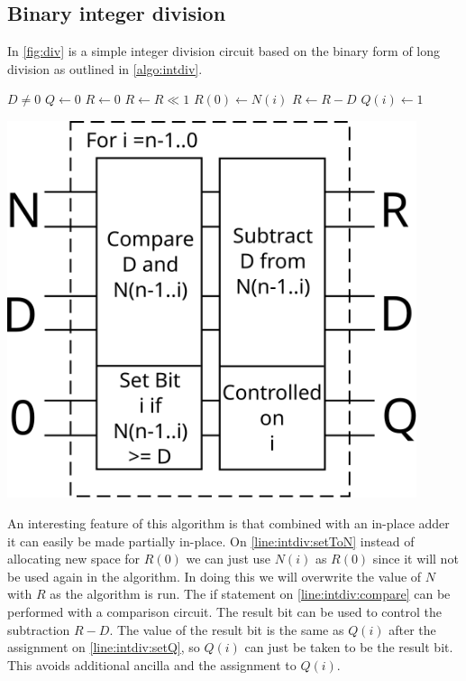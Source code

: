   \subsection{Binary integer division}
    In \cref{fig:div} is a simple integer division circuit based on the binary
    form of long division as outlined in \cref{algo:intdiv}.

    \noindent\begin{minipage}{.5\textwidth}
          \label{algo:intdiv}
         \begin{algorithmic}[1]
           \Require $D \neq 0$
           \State $Q \gets 0$
           \State $R \gets 0$
             \State $R \gets R \ll 1$
             \State $R(0) \gets N(i)$ \label{line:intdiv:setToN}
              \label{line:intdiv:compare}
               \State $R\gets R - D$
               \State $Q(i) \gets 1$ \label{line:intdiv:setQ}
             \EndIf
           \EndFor
         \end{algorithmic}
    \end{minipage}%
    \begin{minipage}{.5\textwidth}
        \centering
        \includegraphics[width=0.9\textwidth]{images/division}
         \label{fig:div}
    \end{minipage}
    \medskip

    An interesting feature of this algorithm is that combined with an in-place
    adder\cite{CDKM:2004} it can easily be made partially in-place.  On
    \cref{line:intdiv:setToN} instead of allocating new space for $R(0)$ we can
    just use $N(i)$ as $R(0)$ since it will not be used again in the algorithm.
    In doing this we will overwrite the value of $N$ with $R$ as the algorithm
    is run.  The if statement on \cref{line:intdiv:compare} can be performed
    with a comparison circuit.  The result bit can be used to control the
    subtraction $R-D$.  The value of the result bit is the same as $Q(i)$ after
    the assignment on \cref{line:intdiv:setQ}, so $Q(i)$ can just be taken to
    be the result bit.  This avoids additional ancilla and the assignment to
    $Q(i)$.

